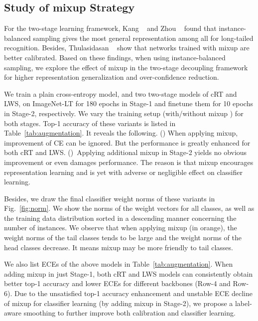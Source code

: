 \documentclass[final]{cvpr}
\begin{document}
	
	\subsection{Study of mixup Strategy}\label{sec:mixup}
	
	For the two-stage learning framework, Kang \etal~\cite{decouple} and Zhou \etal~\cite{bbn} found that instance-balanced sampling gives the most general representation among all for long-tailed recognition. Besides, Thulasidasan \etal~\cite{mixup_ca} show that networks trained with mixup are better calibrated. Based on these findings, when using instance-balanced sampling, we explore the effect of mixup in the two-stage decoupling framework for higher representation generalization and over-confidence reduction.
	
	We train a plain cross-entropy model, and two two-stage models of cRT and LWS, on ImageNet-LT for 180 epochs in Stage-1 and finetune them for 10 epochs in Stage-2, respectively. We vary the training setup (with/without mixup ) for both stages. Top-1 accuracy of these variants is listed in Table~\ref{tab:augmentation}. It reveals the following. 	
	() 
	When applying mixup, improvement of CE can be ignored. But the performance is greatly enhanced for both cRT and LWS. ()~Applying additional mixup in Stage-2 yields no obvious improvement or even damages performance. The reason is that mixup encourages representation learning and is yet with adverse or negligible effect on classifier learning.  

	Besides, we draw the final classifier weight norms of these variants in Fig.~\ref{fig:norm}. We show the  norms of the weight vectors for all classes, as well as the training data distribution sorted in a descending manner concerning the number of instances. We observe that when applying mixup (in orange), the weight norms of the tail classes tends to be large and the weight norms of the head classes decrease. It means mixup may be more friendly to tail classes.
	
	We also list ECEs of the above models in Table~\ref{tab:augmentation}. When adding mixup in just Stage-1, both cRT and LWS models can consistently obtain better top-1 accuracy and lower ECEs for different backbones (Row-4 and Row-6).  Due to the unsatisfied top-1 accuracy enhancement and unstable ECE decline of mixup for classifier learning (by adding mixup in Stage-2), we propose a label-aware smoothing to further improve both calibration and classifier learning.
	
\end{document}
